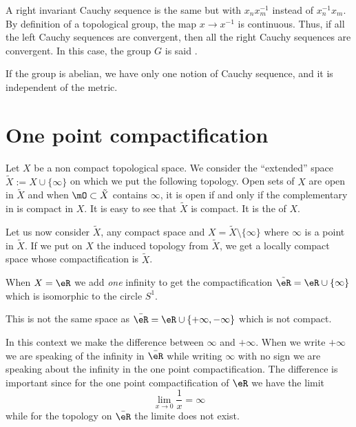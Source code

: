 A right invariant Cauchy sequence is the same but with $x_nx_m^{-1}$ instead of $x_n^{-1} x_m$. By definition of a topological group, the map $x\to x^{-1}$ is continuous. Thus, if all the left Cauchy sequences are convergent, then all the right Cauchy sequences are convergent. In this case, the group $G$ is said .

If the group is abelian, we have only one notion of Cauchy sequence, and it is independent of the metric.

\section{One point compactification}  \label{sec:compactific}

\begin{definition}  \label{DEFooAKWJooWKcYav}
	Let $X$ be a non compact topological space. We consider the ``extended'' space $\tilde X:=X\cup\{ \infty\}$ on which we put the following topology. Open sets of $X$ are open in $\tilde X$ and when $\mO\subset\tilde X$ contains $\infty$, it is open if and only if the complementary in is compact in $X$. It is easy to see that $\tilde X$ is compact. It is the  of $X$.
\end{definition}

Let us now consider $\tilde X$, any compact space and $X=\tilde X\setminus\{\infty\}$ where $\infty$ is a point in $\tilde X$. If we put on $X$ the induced topology from $\tilde X$, we get a locally compact space whose compactification is $\tilde X$.

\begin{example}
	When \( X=\eR\) we add \emph{one} infinity to get the compactification \( \tilde \eR=\eR\cup\{ \infty \}\) which is isomorphic to the circle \( S^1\).

	This is not the same space as \( \bar \eR=\eR\cup\{ +\infty,-\infty \}\) which is not compact.
\end{example}

In this context we make the difference between \( \infty\) and \( +\infty\). When we write \( +\infty\) we are speaking of the infinity in \( \bar \eR\) while writing \( \infty\) with no sign we are speaking about the infinity in the one point compactification. The difference is important since for the one point compactification of \( \eR\) we have the limit
\begin{equation}
	\lim_{x\to 0} \frac{1}{ x }=\infty
\end{equation}
while for the topology on \( \bar \eR\) the limite does not exist.

